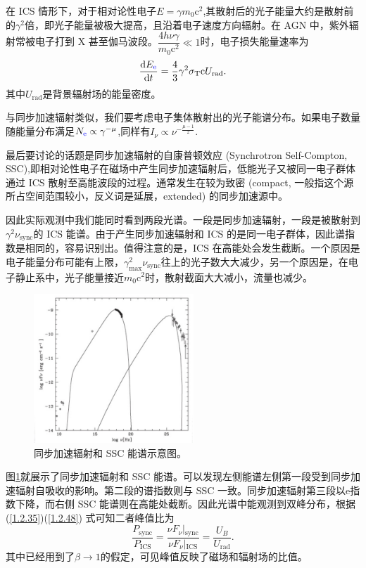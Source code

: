 \documentclass[../天体物理基础.tex]{subfiles}
\begin{document}
在 ICS 情形下，对于相对论性电子$E=\gamma m_{0}\mathrm{c}^{2}$,其散射后的光子能量大约是散射前的$\gamma^{2}$倍，即光子能量被极大提高，且沿着电子速度方向辐射。在 AGN 中，紫外辐射常被电子打到 X 甚至伽马波段。$\dfrac{4h\nu\gamma}{m_{0}\mathrm{c}^{2}}\ll1$时，电子损失能量速率为
\begin{equation}
\frac{\mathrm{d}E_{{\color{blue}{\ce{e}}}}}{\mathrm{d}t}=\frac{4}{3}\gamma^{2}\sigma_{\text{T}}\mathrm{c}U_{\text{rad}}.\label{1.2.48}
\end{equation}
其中$U_{\text{rad}}$是背景辐射场的能量密度。

与同步加速辐射类似，我们要考虑电子集体散射出的光子能谱分布。如果电子数量随能量分布满足$N_{{\color{blue}{\ce{e}}}}\propto{}\gamma^{-\mu}$,同样有$I_{\nu}\propto{}\nu^{-\frac{\mu-1}{2}}$.

最后要讨论的话题是同步加速辐射的自康普顿效应 (Synchrotron Self-Compton, SSC),即相对论性电子在磁场中产生同步加速辐射后，低能光子又被同一电子群体通过 ICS 散射至高能波段的过程。通常发生在较为致密 (compact, 一般指这个源所占空间范围较小，反义词是延展，extended) 的同步加速源中。

因此实际观测中我们能同时看到两段光谱。一段是同步加速辐射，一段是被散射到$\gamma^{2}\nu_{\text{sync}}$的 ICS 能谱。由于产生同步加速辐射和 ICS 的是同一电子群体，因此谱指数是相同的，容易识别出。值得注意的是，ICS 在高能处会发生截断。一个原因是电子能量分布可能有上限，$\gamma_{\max}^{2}\nu_{\text{sync}}$往上的光子数大大减少，另一个原因是，在电子静止系中，光子能量接近$m_{0}\mathrm{c}^{2}$时，散射截面大大减小，流量也减少。

\begin{figure}[!htbp]
\centering
\includegraphics[width=6cm]{figures/figure1_9.png}
\captionsetup{justification=raggedright, singlelinecheck=false}
\caption{同步加速辐射和 SSC 能谱示意图。}
\label{同步加速辐射和 SSC 能谱示意图。}
\end{figure}

图\ref{同步加速辐射和 SSC 能谱示意图。}就展示了同步加速辐射和 SSC 能谱。可以发现左侧能谱左侧第一段受到同步加速辐射自吸收的影响。第二段的谱指数则与 SSC 一致。同步加速辐射第三段以$\mathrm{e}$指数下降，而右侧 SSC 能谱则在高能处截断。因此光谱中能观测到双峰分布，根据 (\ref{1.2.35})(\ref{1.2.48}) 式可知二者峰值比为
\begin{equation}
\frac{P_{\text{sync}}}{P_{\text{ICS}}}=\frac{\left.\nu F_{\nu}\right\vert{}_{\text{sync}}}{\left.\nu F_{\nu}\right\vert{}_{\text{ICS}}}=\frac{U_{B}}{U_{\text{rad}}}.
\end{equation}
其中已经用到了$\beta\to1$的假定，可见峰值反映了磁场和辐射场的比值。
\end{document}
